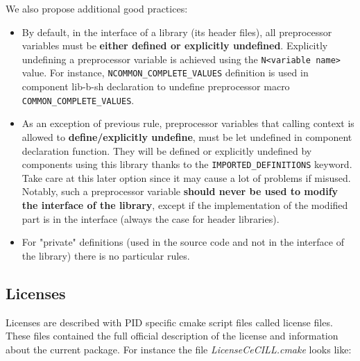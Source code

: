 \documentclass[12pt,a4paper]{article}
\begin{document}
We also propose additional good practices:
\begin{itemize}
\item By default, in the interface of a library (its header files), all preprocessor variables must be \textbf{either defined or explicitly undefined}. Explicitly undefining a preprocessor variable is achieved using the \texttt{N<variable name>} value. For instance, \texttt{NCOMMON\_COMPLETE\_VALUES} definition is used in component lib-b-sh declaration to undefine preprocessor macro \texttt{COMMON\_COMPLETE\_VALUES}.
\item As an exception of previous rule, preprocessor variables that calling context is allowed to \textbf{define/explicitly undefine}, must be let undefined in component declaration function. They will be defined or explicitly undefined by components using this library thanks to the \texttt{IMPORTED\_DEFINITIONS} keyword. Take care at this later option since it may cause a lot of problems if misused. Notably, such a preprocessor variable \textbf{should never be used to modify the interface of the library}, except if the implementation of the modified part is in the interface (always the case for header libraries).
\item For "private" definitions (used in the source code and not in the interface of the library) there is no particular rules.
\end{itemize}

\pagebreak

\subsection{Licenses}
\label{sec:licenses}

Licenses are described with PID specific cmake script files called license files. These files contained the full official description of the license and information about the current package. For instance the file \textit{LicenseCeCILL.cmake} looks like:
\end{document}
